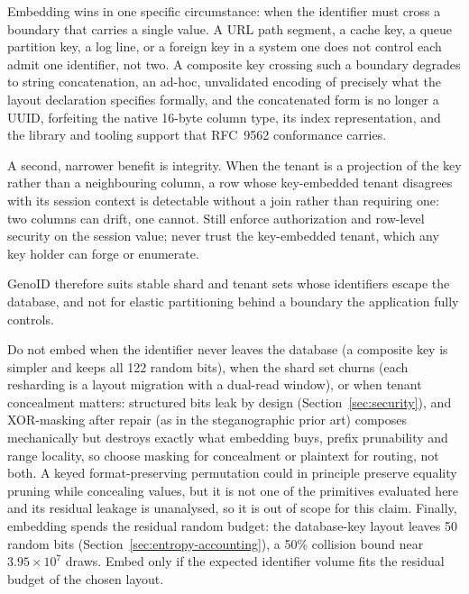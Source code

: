 \documentclass{svproc}
\begin{document}
Embedding wins in one specific circumstance: when the identifier must
cross a boundary that carries a single value. A URL path segment, a cache
key, a queue partition key, a log line, or a foreign key in a system one
does not control each admit one identifier, not two. A composite key
crossing such a boundary degrades to string concatenation, an ad-hoc,
unvalidated encoding of precisely what the layout declaration specifies
formally, and the concatenated form is no longer a UUID, forfeiting
the native 16-byte column type, its index representation, and the library
and tooling support that RFC~9562 conformance carries.

A second, narrower benefit is integrity. When the tenant is a projection
of the key rather than a neighbouring column, a row whose key-embedded tenant
disagrees with its session context is detectable without a join rather than
requiring one: two columns can drift, one cannot. Still enforce authorization
and row-level security on the session value; never trust the key-embedded tenant,
which any key holder can forge or enumerate.

GenoID therefore suits stable shard and tenant sets whose
identifiers escape the database, and not for elastic partitioning behind
a boundary the application fully controls.

Do not embed when the identifier never leaves the database (a composite
key is simpler and keeps all 122 random bits), when the shard set churns
(each resharding is a layout migration with a dual-read window), or when
tenant concealment matters: structured bits leak by design
(Section~\ref{sec:security}), and XOR-masking after repair (as in
the steganographic prior art) composes mechanically but destroys exactly what
embedding buys, prefix prunability and range locality, so choose
masking for concealment or plaintext for routing, not both. A keyed
format-preserving permutation could in principle preserve equality pruning while
concealing values, but it is not one of the primitives evaluated here and its
residual leakage is unanalysed, so it is out of scope for this claim. Finally,
embedding spends the residual random budget: the database-key layout leaves 50
random bits (Section~\ref{sec:entropy-accounting}), a 50\% collision bound near
$3.95\times10^7$ draws. Embed only if the expected identifier volume fits the
residual budget of the chosen layout.
\end{document}
